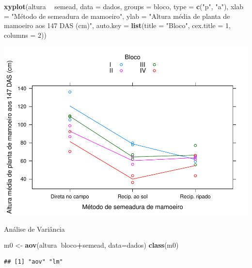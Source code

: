 \documentclass[
]{book}
\newenvironment{Shaded}{\begin{snugshade}}{\end{snugshade}}
\newcommand{\DataTypeTok}[1]{\textcolor[rgb]{0.13,0.29,0.53}{#1}}
\newcommand{\DecValTok}[1]{\textcolor[rgb]{0.00,0.00,0.81}{#1}}
\newcommand{\KeywordTok}[1]{\textcolor[rgb]{0.13,0.29,0.53}{\textbf{#1}}}
\newcommand{\NormalTok}[1]{#1}
\newcommand{\OperatorTok}[1]{\textcolor[rgb]{0.81,0.36,0.00}{\textbf{#1}}}
\newcommand{\StringTok}[1]{\textcolor[rgb]{0.31,0.60,0.02}{#1}}
\begin{document}
\begin{Shaded}
\begin{Highlighting}[]
\KeywordTok{xyplot}\NormalTok{(altura }\OperatorTok{~}\StringTok{ }\NormalTok{semead, }\DataTypeTok{data =}\NormalTok{ dados,}
  \DataTypeTok{groups =}\NormalTok{ bloco, }\DataTypeTok{type =} \KeywordTok{c}\NormalTok{(}\StringTok{"p"}\NormalTok{, }\StringTok{"a"}\NormalTok{),}
  \DataTypeTok{xlab =} \StringTok{"Método de semeadura de mamoeiro"}\NormalTok{,}
  \DataTypeTok{ylab =} \StringTok{"Altura média de planta de mamoeiro aos 147 DAS (cm)"}\NormalTok{,}
  \DataTypeTok{auto.key =} \KeywordTok{list}\NormalTok{(}\DataTypeTok{title =} \StringTok{"Bloco"}\NormalTok{, }\DataTypeTok{cex.title =} \DecValTok{1}\NormalTok{, }\DataTypeTok{columns =} \DecValTok{2}\NormalTok{))}
\end{Highlighting}
\end{Shaded}

\includegraphics{TudodoR_files/figure-latex/unnamed-chunk-312-1.pdf}

Análise de Variância

\begin{Shaded}
\begin{Highlighting}[]
\NormalTok{m0 <-}\StringTok{ }\KeywordTok{aov}\NormalTok{(altura}\OperatorTok{~}\NormalTok{bloco}\OperatorTok{+}\NormalTok{semead, }\DataTypeTok{data=}\NormalTok{dados)}
\KeywordTok{class}\NormalTok{(m0)}
\end{Highlighting}
\end{Shaded}

\begin{verbatim}
## [1] "aov" "lm"
\end{verbatim}
\end{document}
